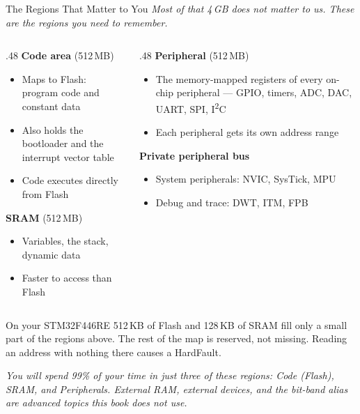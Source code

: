 \documentclass[9pt,aspectratio=169,xcolor=table]{beamer}
\begin{document}
\begin{frame}{The Regions That Matter to You}
	{\small\emph{Most of that 4\,GB does not matter to us. These are the regions you need to remember.}}

	\vspace{1mm}
	\begin{columns}[T]
	\begin{column}{.48\textwidth}
		\textbf{Code area} (512\,MB)
		{\small
		\begin{itemize}\itemsep1pt
			\item Maps to Flash: program code and constant data
			\item Also holds the bootloader and the \alert{interrupt vector table}
			\item Code executes directly from Flash
		\end{itemize}}
		\vspace{1mm}
		\textbf{SRAM} (512\,MB)
		{\small
		\begin{itemize}\itemsep1pt
			\item Variables, the stack, dynamic data
			\item Faster to access than Flash
		\end{itemize}}
	\end{column}
	\begin{column}{.48\textwidth}
		\textbf{Peripheral} (512\,MB)
		{\small
		\begin{itemize}\itemsep1pt
			\item The memory-mapped registers of every on-chip peripheral --- GPIO, timers, ADC, DAC, UART, SPI, I\textsuperscript{2}C
			\item Each peripheral gets its own address range
		\end{itemize}}
		\vspace{1mm}
		\textbf{Private peripheral bus}
		{\small
		\begin{itemize}\itemsep1pt
			\item System peripherals: \alert{NVIC}, SysTick, MPU
			\item Debug and trace: DWT, ITM, FPB
		\end{itemize}}
	\end{column}
	\end{columns}

	\vspace{3mm}
	\begin{block}{On your STM32F446RE}
		512\,KB of Flash and 128\,KB of SRAM fill only a small part of the regions above. The rest of the map is \alert{reserved}, not missing. Reading an address with nothing there causes a HardFault.
	\end{block}

	\vspace{1mm}
	{\footnotesize\itshape You will spend 99\% of your time in just three
	of these regions: \alert{Code} (Flash), \alert{SRAM}, and
	\alert{Peripherals}. External RAM, external devices, and the
	bit-band alias are advanced topics this book does not use.}
\end{frame}
\end{document}
